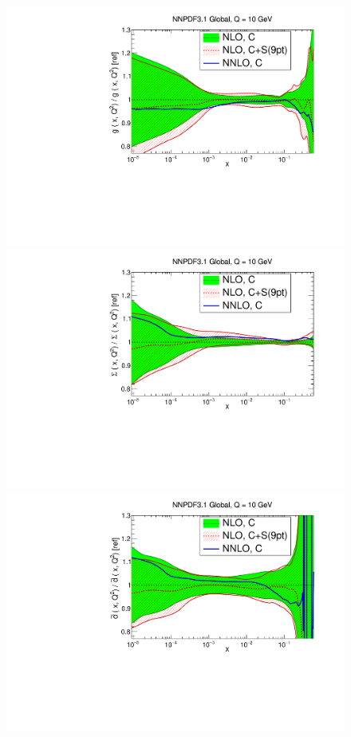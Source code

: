 \begin{figure}[t]
  \begin{center}
    \includegraphics[scale=0.39]{mhous/plots/xg-Global-NLO-CovMatTH-EXP-vsTH.pdf}
    \includegraphics[scale=0.39]{mhous/plots/xsinglet-Global-NLO-CovMatTH-EXP-vsTH.pdf}
    \includegraphics[scale=0.39]{mhous/plots/xdbar-Global-NLO-CovMatTH-EXP-vsTH.pdf}

\end{center}
\end{figure}
